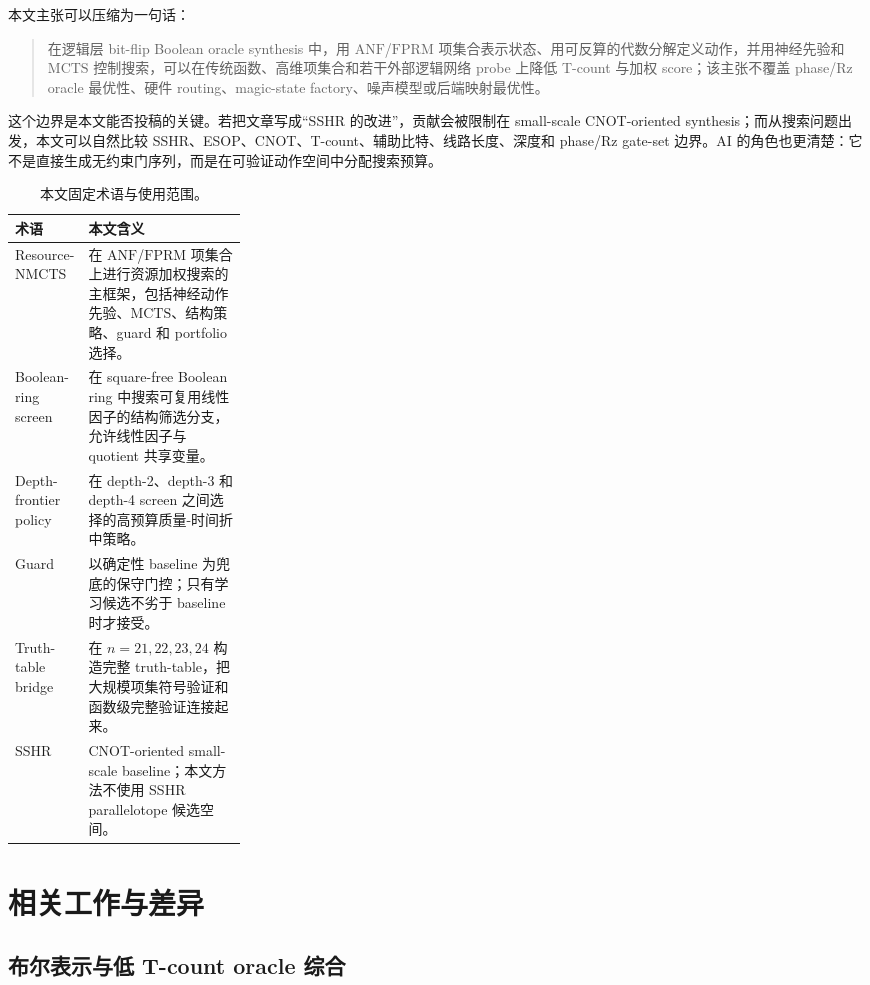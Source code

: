 \documentclass[UTF8,fontset=macnew,11pt]{ctexart}
\newcommand{\method}{Resource-NMCTS}
\newcommand{\anf}{\ensuremath{\mathrm{ANF}}}
\newcommand{\fprm}{\ensuremath{\mathrm{FPRM}}}
\newcommand{\mcts}{\ensuremath{\mathrm{MCTS}}}
\newcommand{\ttable}{truth-table}
\begin{document}
本文主张可以压缩为一句话：

\begin{quote}
在逻辑层 bit-flip Boolean oracle synthesis 中，用 \anf{}/\fprm{} 项集合表示状态、用可反算的代数分解定义动作，并用神经先验和 \mcts{} 控制搜索，可以在传统函数、高维项集合和若干外部逻辑网络 probe 上降低 T-count 与加权 score；该主张不覆盖 phase/Rz oracle 最优性、硬件 routing、magic-state factory、噪声模型或后端映射最优性。
\end{quote}

这个边界是本文能否投稿的关键。若把文章写成“SSHR 的改进”，贡献会被限制在 small-scale CNOT-oriented synthesis；而从搜索问题出发，本文可以自然比较 SSHR、ESOP、CNOT、T-count、辅助比特、线路长度、深度和 phase/Rz gate-set 边界。AI 的角色也更清楚：它不是直接生成无约束门序列，而是在可验证动作空间中分配搜索预算。

\begin{table}[H]
\centering
\small
\caption{本文固定术语与使用范围。}
\label{tab:terms}
\begin{tabularx}{\linewidth}{>{\raggedright\arraybackslash}p{0.27\linewidth}>{\raggedright\arraybackslash}X}
\toprule
术语 & 本文含义 \\
\midrule
\method{} & 在 \anf{}/\fprm{} 项集合上进行资源加权搜索的主框架，包括神经动作先验、\mcts{}、结构策略、guard 和 portfolio 选择。 \\
Boolean-ring screen & 在 square-free Boolean ring 中搜索可复用线性因子的结构筛选分支，允许线性因子与 quotient 共享变量。 \\
Depth-frontier policy & 在 depth-2、depth-3 和 depth-4 screen 之间选择的高预算质量-时间折中策略。 \\
Guard & 以确定性 baseline 为兜底的保守门控；只有学习候选不劣于 baseline 时才接受。 \\
Truth-table bridge & 在 $n=21,22,23,24$ 构造完整 \ttable{}，把大规模项集符号验证和函数级完整验证连接起来。 \\
SSHR & CNOT-oriented small-scale baseline；本文方法不使用 SSHR parallelotope 候选空间。 \\
\bottomrule
\end{tabularx}
\end{table}

\section{相关工作与差异}

\subsection{布尔表示与低 T-count oracle 综合}
\end{document}
